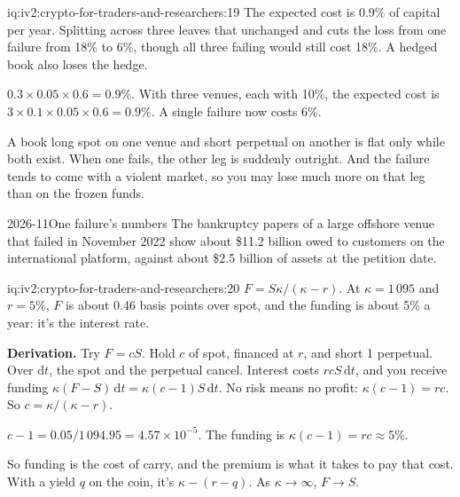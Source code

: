 \begin{solution}{iq:iv2:crypto-for-traders-and-researchers:19}
The expected cost is 0.9\% of capital per year. Splitting across three leaves that unchanged and cuts the loss from one failure from 18\% to 6\%, though all three failing would still cost 18\%. A hedged book also loses the hedge.

$0.3 \times 0.05 \times 0.6 = 0.9\%$. With three venues, each with 10\%, the expected cost is $3 \times 0.1 \times 0.05 \times 0.6 = 0.9\%$. A single failure now costs 6\%.

A book long spot on one venue and short perpetual on another is flat only while both exist. When one fails, the other leg is suddenly outright. And the failure tends to come with a violent market, so you may lose much more on that leg than on the frozen funds.

\begin{dated}{2026-11}{One failure's numbers}\label{dat:iv2:crypto-for-traders-and-researchers:fail}
The bankruptcy papers of a large offshore venue that failed in November 2022 show about \$11.2 billion owed to customers on the international platform, against about \$2.5 billion of assets at the petition date.
\end{dated}

\end{solution}

\begin{solution}{iq:iv2:crypto-for-traders-and-researchers:20}
$F = S\kappa/(\kappa - r)$. At $\kappa = 1\,095$ and $r = 5\%$, $F$ is about 0.46 basis points over spot, and the funding is about 5\% a year: it's the interest rate.

\textbf{Derivation.} Try $F = cS$. Hold $c$ of spot, financed at $r$, and short 1 perpetual. Over $\mathrm{d}t$, the spot and the perpetual cancel. Interest costs $rcS\,\mathrm{d}t$, and you receive funding $\kappa(F - S)\,\mathrm{d}t = \kappa(c - 1)S\,\mathrm{d}t$. No risk means no profit: $\kappa(c - 1) = rc$. So $c = \kappa/(\kappa - r)$.

$c - 1 = 0.05/1\,094.95 = 4.57 \times 10^{-5}$. The funding is $\kappa(c - 1) = rc \approx 5\%$.

So funding is the cost of carry, and the premium is what it takes to pay that cost. With a yield $q$ on the coin, it's $\kappa - (r - q)$. As $\kappa \to \infty$, $F \to S$.

\end{solution}

